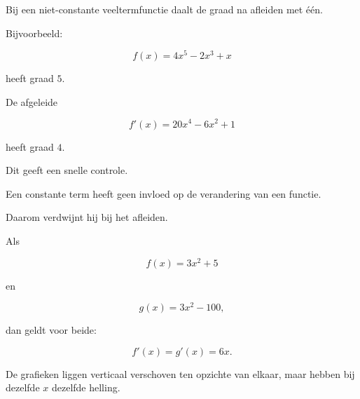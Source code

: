 \documentclass{ximera}
\begin{document}





Bij een niet-constante veeltermfunctie daalt de graad na afleiden
met één.

Bijvoorbeeld:

\[
f(x)=4x^5-2x^3+x
\]

heeft graad $5$.

De afgeleide

\[
f'(x)=20x^4-6x^2+1
\]

heeft graad $4$.

Dit geeft een snelle controle.




Een constante term heeft geen invloed op de verandering van een functie.

Daarom verdwijnt hij bij het afleiden.

Als

\[
f(x)=3x^2+5
\]

en

\[
g(x)=3x^2-100,
\]

dan geldt voor beide:

\[
f'(x)=g'(x)=6x.
\]

De grafieken liggen verticaal verschoven ten opzichte van elkaar,
maar hebben bij dezelfde $x$ dezelfde helling.
\end{document}
